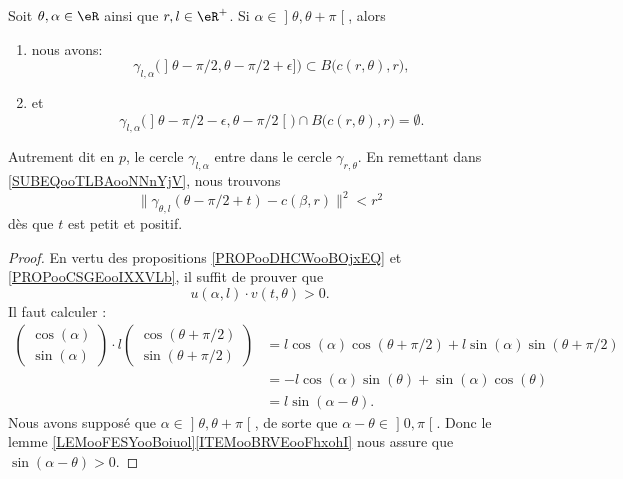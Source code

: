 \begin{proposition}	\label{PROPooMWKYooCXZznB}
	Soit \( \theta,\alpha\in \eR\) ainsi que \( r,l\in \eR^+\). Si \( \alpha\in\mathopen] \theta,\theta+\pi\mathclose[\), alors
	\begin{enumerate}
		\item
		      nous avons:
		      \begin{equation}
			      \gamma_{l,\alpha}\big( \mathopen] \theta-\pi/2,\theta-\pi/2+\epsilon\mathclose] \big)\subset B\big( c(r,\theta),r \big),
		      \end{equation}
		\item
		      et
		      \begin{equation}
			      \gamma_{l,\alpha}\big( \mathopen] \theta-\pi/2-\epsilon,\theta-\pi/2\mathclose[ \big)\cap B\big( c(r,\theta),r \big)=\emptyset.
		      \end{equation}
	\end{enumerate}
	Autrement dit en \( p\), le cercle \( \gamma_{l,\alpha}\) entre dans le cercle \( \gamma_{r,\theta}\). En remettant dans \eqref{SUBEQooTLBAooNNnYjV}, nous trouvons
	\begin{equation}
		\| \gamma_{\theta,l}(\theta-\pi/2+t)-c(\beta,r) \|^2<r^2
	\end{equation}
	dès que \( t\) est petit et positif.
\end{proposition}

\begin{proof}
	En vertu des propositions \ref{PROPooDHCWooBOjxEQ} et \ref{PROPooCSGEooIXXVLb}, il suffit de prouver que
	\begin{equation}
		u(\alpha,l)\cdot v(t,\theta)>0.
	\end{equation}
	Il faut calculer :
	\begin{subequations}
		\begin{align}
			\begin{pmatrix}
				\cos(\alpha) \\
				\sin(\alpha)
			\end{pmatrix}\cdot l\begin{pmatrix}
				                    \cos(\theta+\pi/2) \\
				                    \sin(\theta+\pi/2)
			                    \end{pmatrix} & =l\cos(\alpha)\cos(\theta+\pi/2)+l\sin(\alpha)\sin(\theta+\pi/2) \\
			                                    & =-l\cos(\alpha)\sin(\theta)+\sin(\alpha)\cos(\theta)           \\
			                                    & =l\sin(\alpha-\theta).
		\end{align}
	\end{subequations}
	Nous avons supposé que \( \alpha\in\mathopen] \theta,\theta+\pi\mathclose[\), de sorte que \( \alpha-\theta\in\mathopen] 0,\pi\mathclose[\). Donc le lemme \ref{LEMooFESYooBoiuol}\ref{ITEMooBRVEooFhxohI} nous assure que \( \sin(\alpha-\theta)>0\).
\end{proof}

